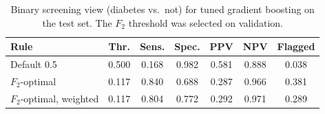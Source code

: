 \begin{table}[t]
\centering\footnotesize
\caption{Binary screening view (diabetes vs.\ not) for tuned gradient boosting on the test set. The $F_2$ threshold was selected on validation.}
\label{tab:screening}
\begin{tabular}{@{}lcccccc@{}}
\toprule
Rule & Thr. & Sens. & Spec. & PPV & NPV & Flagged\\
\midrule
Default 0.5 & 0.500 & 0.168 & 0.982 & 0.581 & 0.888 & 0.038 \\
$F_2$-optimal & 0.117 & 0.840 & 0.688 & 0.287 & 0.966 & 0.381 \\
$F_2$-optimal, weighted & 0.117 & 0.804 & 0.772 & 0.292 & 0.971 & 0.289 \\
\bottomrule
\end{tabular}
\end{table}
